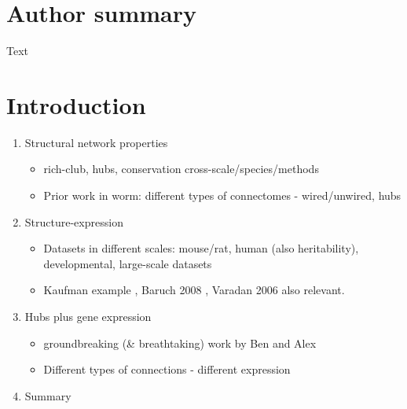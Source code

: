 \documentclass[10pt,letterpaper]{article}
\begin{document}
\section*{Author summary}
Text

\linenumbers

\section*{Introduction}

\begin{enumerate}
    \item{Structural network properties}
    \begin{itemize}
    \item{rich-club, hubs, conservation cross-scale/species/methods}
    \item{Prior work in worm: different types of connectomes - wired/unwired, hubs}
    \end{itemize}

    \item{Structure-expression}
    \begin{itemize}
    \item{Datasets in different scales: mouse/rat, human (also heritability), developmental, large-scale datasets}
    \item{Kaufman example \cite{Kaufman2006}, Baruch 2008 \cite{Baruch2008b}, Varadan 2006 \cite{Varadan2006} also relevant.}
    \end{itemize}

    \item{Hubs plus gene expression}
    \begin{itemize}
    \item{groundbreaking (\& breathtaking) work by Ben and Alex \cite{Fulcher2016}}
    \item{Different types of connections - different expression}
    \end{itemize}
    \item{Summary}

 \end{enumerate}
\end{document}
